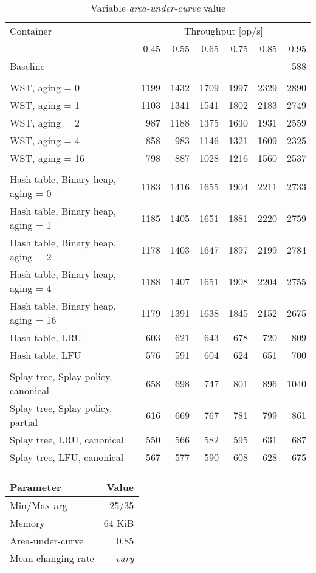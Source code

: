 \begin{table}
\caption{Variable \emph{area-under-curve} value}
\begin{tabular}[]{l r r r r r r} \toprule
Container & \multicolumn{6}{c}{Throughput [op/s]} \\ \cmidrule(r){2-7}
& 0.45 & 0.55 & 0.65 & 0.75 & 0.85 & 0.95 \\ \midrule
Baseline & \multicolumn{6}{r}{588}  \\
\\
WST, aging = 0 & 1199 & 1432 & 1709 & 1997 & 2329 & 2890 \\
WST, aging = 1 & 1103 & 1341 & 1541 & 1802 & 2183 & 2749 \\
WST, aging = 2 & 987 & 1188 & 1375 & 1630 & 1931 & 2559 \\
WST, aging = 4 & 858 & 983 & 1146 & 1321 & 1609 & 2325 \\
WST, aging = 16 & 798 & 887 & 1028 & 1216 & 1560 & 2537 \\
\\
Hash table, Binary heap, aging = 0 & 1183 & 1416 & 1655 & 1904 & 2211 & 2733 \\
Hash table, Binary heap, aging = 1 & 1185 & 1405 & 1651 & 1881 & 2220 & 2759 \\
Hash table, Binary heap, aging = 2 & 1178 & 1403 & 1647 & 1897 & 2199 & 2784 \\
Hash table, Binary heap, aging = 4 & 1188 & 1407 & 1651 & 1908 & 2204 & 2755 \\
Hash table, Binary heap, aging = 16 & 1179 & 1391 & 1638 & 1845 & 2152 & 2675 \\
Hash table, LRU & 603 & 621 & 643 & 678 & 720 & 809 \\
Hash table, LFU & 576 & 591 & 604 & 624 & 651 & 700 \\
\\
Splay tree, Splay policy, canonical & 658 & 698 & 747 & 801 & 896 & 1040 \\
Splay tree, Splay policy, partial & 616 & 669 & 767 & 781 & 799 & 861 \\
Splay tree, LRU, canonical & 550 & 566 & 582 & 595 & 631 & 687 \\
Splay tree, LFU, canonical & 567 & 577 & 590 & 608 & 628 & 675 \\
\bottomrule
\end{tabular}
\end{table}

\pagebreak

\begin{tabular}[h]{l r} \toprule
Parameter & Value \\ \midrule
Min/Max arg & 25/35 \\
Memory & 64 KiB \\
Area-under-curve & 0.85 \\
Mean changing rate & \emph{vary} \\ \bottomrule
\end{tabular}

